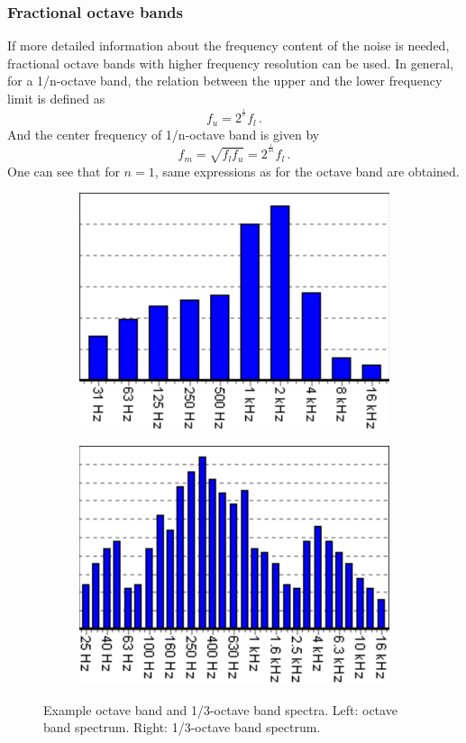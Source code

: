 \subsubsection*{Fractional octave bands}

If more detailed information about the frequency content of the noise is needed, fractional octave bands with higher frequency resolution can be used. In general, for a 1/n-octave band, the relation between the upper and the lower frequency limit is defined as
\begin{equation}
	f_u = 2^{^\frac{1}{n}}f_l\,.
\end{equation}
And the center frequency of 1/n-octave band is given by
\begin{equation}
	f_m = \sqrt{f_l f_u} = 2^{^{\frac{1}{2n}}}f_l\,.
\end{equation}
One can see that for $n = 1$, same expressions as for the octave band are obtained.

\begin{figure}[H]
	\centering
	\begin{subfigure}[b]{0.49\textwidth}
		\centering
		\includegraphics[width=0.8\linewidth]{fig/octave_band.PNG}
	\end{subfigure}
	\begin{subfigure}[b]{0.49\textwidth}
		\centering
		\includegraphics[width=0.8\linewidth]{fig/one_third_octave_band.PNG}
	\end{subfigure}
	\caption{Example octave band and 1/3-octave band spectra. Left: octave band spectrum. Right: 1/3-octave band spectrum. \cite{octave_band} }
	\label{fig:octave_band_filters}
\end{figure}

